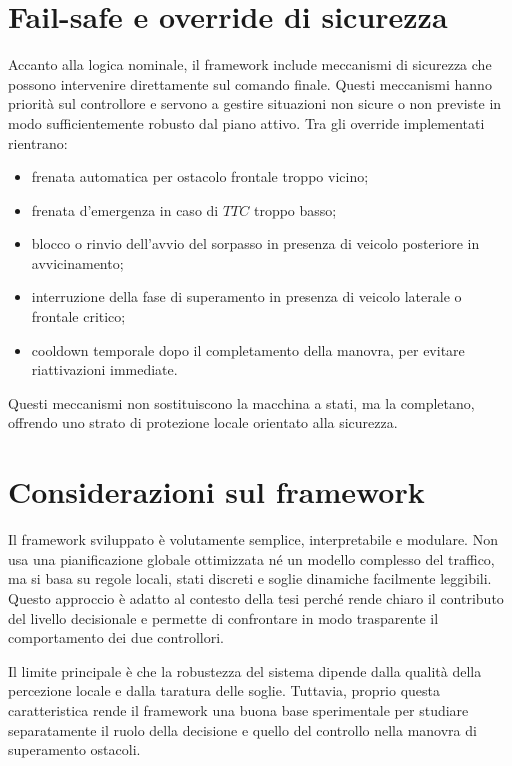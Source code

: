 \section{Fail-safe e override di sicurezza}

Accanto alla logica nominale, il framework include meccanismi di sicurezza che possono intervenire direttamente sul comando finale. Questi meccanismi hanno priorità sul controllore e servono a gestire situazioni non sicure o non previste in modo sufficientemente robusto dal piano attivo. Tra gli override implementati rientrano:

\begin{itemize}
    \item frenata automatica per ostacolo frontale troppo vicino;
    \item frenata d'emergenza in caso di \(TTC\) troppo basso;
    \item blocco o rinvio dell'avvio del sorpasso in presenza di veicolo posteriore in avvicinamento;
    \item interruzione della fase di superamento in presenza di veicolo laterale o frontale critico;
    \item cooldown temporale dopo il completamento della manovra, per evitare riattivazioni immediate.
\end{itemize}

Questi meccanismi non sostituiscono la macchina a stati, ma la completano, offrendo uno strato di protezione locale orientato alla sicurezza.

\section{Considerazioni sul framework}

Il framework sviluppato è volutamente semplice, interpretabile e modulare. Non usa una pianificazione globale ottimizzata né un modello complesso del traffico, ma si basa su regole locali, stati discreti e soglie dinamiche facilmente leggibili. Questo approccio è adatto al contesto della tesi perché rende chiaro il contributo del livello decisionale e permette di confrontare in modo trasparente il comportamento dei due controllori.

Il limite principale è che la robustezza del sistema dipende dalla qualità della percezione locale e dalla taratura delle soglie. Tuttavia, proprio questa caratteristica rende il framework una buona base sperimentale per studiare separatamente il ruolo della decisione e quello del controllo nella manovra di superamento ostacoli.
